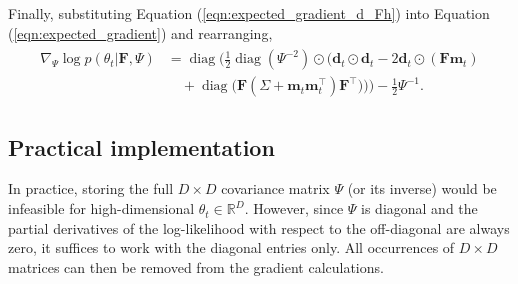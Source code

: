 \documentclass[msc,deptreport.inf]{infthesis} %
\newcommand{\matr}[1]{\mathbf{#1}}
\newcommand{\R}{\mathbb R}
\newcommand{\diag}{\mathop{\mathrm{diag}}}
\begin{document}
Finally, substituting Equation (\ref{eqn:expected_gradient_d_Fh}) into Equation (\ref{eqn:expected_gradient}) and rearranging, 
\begin{align}
\begin{split}\label{eqn:derivatives_wrt_Psi}
	\nabla_{\Psi} \log p(\theta_t | \matr{F}, \Psi) 
	& = \diag\Bigg(\frac{1}{2} \diag(\Psi^{-2}) \odot \Big(\matr{d}_t \odot \matr{d}_t - 2\matr{d}_t \odot (\matr{F} \matr{m}_t) \\
	& \quad + \diag\big( \matr{F} (\Sigma + \matr{m}_t \matr{m}_t^\intercal) \matr{F}^\intercal \big) \Big) \Bigg)
	 - \frac{1}{2} \Psi^{-1}.
\end{split}
\end{align} 

\subsection{Practical implementation}

In practice, storing the full $D\times D$ covariance matrix $\Psi$ (or its inverse) would be infeasible for high-dimensional $\theta_t \in \R^D$. However, since $\Psi$ is diagonal and the partial derivatives of the log-likelihood with respect to the off-diagonal are always zero, it suffices to work with the diagonal entries only. All occurrences of $D \times D$ matrices can then be removed from the gradient calculations. 
\end{document}
